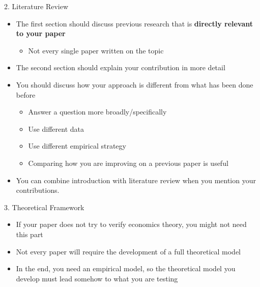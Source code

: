 \documentclass[dvipsnames,hyperref={pdfpagelabels=false}]{beamer}
\begin{document}
\begin{frame}{2. Literature Review}
	\begin{itemize} 
		
		\item The first section should discuss previous research that is \textbf{directly relevant to your paper}
		\vspace{0.2cm}
		\begin{itemize} 
			\item Not every single paper written on the topic
		\end{itemize}
		\vspace{0.2cm}
		\item The second section should explain your contribution in more detail
		\vspace{0.2cm}
		\item You should discuss how your approach is different from what has been done before
		\vspace{0.2cm}
		\begin{itemize}
			\item Answer a question more broadly/specifically
			\vspace{0.2cm}
			\item Use different data
			\vspace{0.2cm} 
			\item Use different empirical strategy
			\vspace{0.2cm} 
			\item Comparing how you are improving on a previous paper is useful
		\end{itemize}
		\vspace{0.2cm}
		\item You can combine introduction with literature review when you mention your contributions.
		
		
	\end{itemize}
	
	
	
\end{frame}





\begin{frame}{3. Theoretical Framework}
	\begin{itemize} 
		
		\item If your paper does not try to verify economics theory, you might not need this part
		\vspace{0.2cm}
		\item Not every paper will require the development of a full theoretical model
		\vspace{0.2cm}
		\item In the end, you need an empirical model, so the theoretical model you develop must lead somehow to what you are testing
		
		
		
	\end{itemize}
	
	
	
\end{frame}
\end{document}
